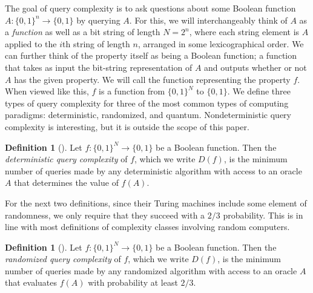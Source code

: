 \documentclass{reedthesis}
\theoremstyle{plain}
\theoremstyle{definition}
\newtheorem{defn}[thm]{Definition}
\theoremstyle{remark}
\numberwithin{equation}{section}
\begin{document}
The goal of query complexity is to ask questions about some Boolean function
$A: \{0, 1\}^{n} \rightarrow \{0, 1\}$ by querying $A$. For this, we will interchangeably
think of $A$ as a \emph{function} as well as a bit string of length $N = 2^{n}$,
where each string element is $A$ applied to the $i$th string of length $n$,
arranged in some lexicographical order. %
We can further think of the property itself as being a Boolean function; a
function that takes as input the bit-string representation of $A$ and outputs
whether or not $A$ has the given property. We will call the function
representing the property $f$. When viewed like this, $f$ is a function from
$\{0, 1\}^{N}$ to $\{0, 1\}$. We define three types of query complexity for
three of the most common types of computing paradigms: deterministic,
randomized, and quantum. Nondeterministic query complexity is interesting, but
it is outside the scope of this paper.

\begin{defn}[{\cite[17]{AW09}}]\label{def:det-qc}
  Let $f: \{0, 1\}^{N} \rightarrow \{0, 1\}$ be a Boolean function. Then the
  \emph{deterministic query complexity} of $f$, which we write $D(f)$, is the
  minimum number of queries made by any deterministic algorithm with access to
  an oracle $A$ that determines the value of $f(A)$.
\end{defn}

For the next two definitions, since their Turing machines include some element
of randomness, we only require that they succeed with a $2/3$ probability. This
is in line with most definitions of complexity classes involving random
computers.

\begin{defn}[{\cite[17]{AW09}}]\label{def:rand-qc}
  Let $f: \{0, 1\}^{N} \rightarrow \{0, 1\}$ be a Boolean function. Then the
  \emph{randomized query complexity} of $f$, which we write $D(f)$, is the
  minimum number of queries made by any randomized algorithm with access to an
  oracle $A$ that evaluates $f(A)$ with probability at least $2/3$.
\end{defn}

\end{document}
